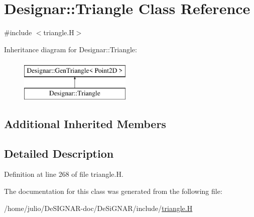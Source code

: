 \hypertarget{class_designar_1_1_triangle}{}\section{Designar\+:\+:Triangle Class Reference}
\label{class_designar_1_1_triangle}


{\ttfamily \#include $<$triangle.\+H$>$}

Inheritance diagram for Designar\+:\+:Triangle\+:\begin{figure}[H]
\begin{center}
\leavevmode
\includegraphics[height=2.000000cm]{class_designar_1_1_triangle}
\end{center}
\end{figure}
\subsection*{Additional Inherited Members}


\subsection{Detailed Description}


Definition at line 268 of file triangle.\+H.



The documentation for this class was generated from the following file\+:\begin{DoxyCompactItemize}
\item 
/home/julio/\+De\+S\+I\+G\+N\+A\+R-\/doc/\+De\+Si\+G\+N\+A\+R/include/\hyperlink{triangle_8_h}{triangle.\+H}\end{DoxyCompactItemize}
